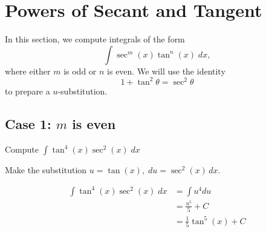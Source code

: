 \documentclass{ximera}
\begin{document}



\section{Powers of Secant and Tangent}
In this section, we compute integrals of the form
\[
\int \sec^m(x)\tan^n(x) \; dx,
\]
where either $m$ is odd or $n$ is even. We will use the identity
\[
1+\tan^2 \theta = \sec^2 \theta
\]
to prepare a $u$-substitution.


\subsection{Case 1: $m$ is even}
\begin{example}[example 7]
Compute $\displaystyle{\int \tan^4(x) \sec^2(x)\;dx}$

Make the substitution $u = \tan(x), \; du = \sec^2(x) \, dx$.

\begin{align*}
\int \tan^4(x) \sec^2(x)\;dx &= \int u^4 du\\
&=  \frac{u^5}{5} + C  \\
&= \frac15\tan^5(x)  + C
\end{align*}
\end{example} 
\end{document}
